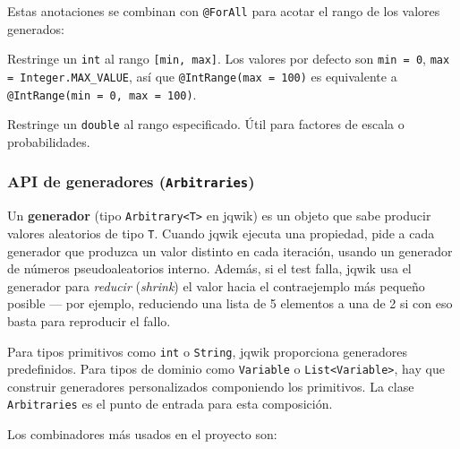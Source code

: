\documentclass[12pt,a4paper]{article}
\begin{document}
Estas anotaciones se combinan con \texttt{@ForAll} para acotar el rango de
los valores generados:

\begin{description}[leftmargin=2em, style=nextline]
  \item[\texttt{@IntRange(min, max)}]
    Restringe un \texttt{int} al rango \texttt{[min, max]}. Los valores
    por defecto son \texttt{min = 0}, \texttt{max = Integer.MAX\_VALUE},
    así que \texttt{@IntRange(max = 100)} es equivalente a
    \texttt{@IntRange(min = 0, max = 100)}.

  \item[\texttt{@DoubleRange(min, max)}]
    Restringe un \texttt{double} al rango especificado. Útil para factores
    de escala o probabilidades.
\end{description}

\subsubsection{API de generadores (\texttt{Arbitraries})}
\label{sec:generadores}

Un \textbf{generador} (tipo \texttt{Arbitrary<T>} en jqwik) es un objeto
que sabe producir valores aleatorios de tipo \texttt{T}. Cuando jqwik
ejecuta una propiedad, pide a cada generador que produzca un valor
distinto en cada iteración, usando un generador de números pseudoaleatorios
interno. Además, si el test falla, jqwik usa el generador para
\emph{reducir} (\emph{shrink}) el valor hacia el contraejemplo más
pequeño posible --- por ejemplo, reduciendo una lista de 5 elementos a
una de 2 si con eso basta para reproducir el fallo.

Para tipos primitivos como \texttt{int} o \texttt{String}, jqwik
proporciona generadores predefinidos. Para tipos de dominio como
\texttt{Variable} o \texttt{List<Variable>}, hay que construir generadores
personalizados componiendo los primitivos. La clase \texttt{Arbitraries}
es el punto de entrada para esta composición.

Los combinadores más usados en el proyecto son:
\end{document}
